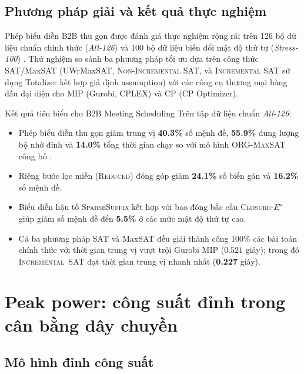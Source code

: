 \subsection{Phương pháp giải và kết quả thực nghiệm}

Phép biểu diễn B2B thu gọn được đánh giá thực nghiệm rộng rãi trên 126 bộ dữ liệu chuẩn chính thức (\emph{All-126}) và 100 bộ dữ liệu biến đổi mật độ thứ tự (\emph{Stress-100}) \parencite{nguyen2026compactsatmaxsatencodings}. Thử nghiệm so sánh ba phương pháp tối ưu dựa trên công thức SAT/MaxSAT (UWrMaxSAT, \textsc{Non-Incremental SAT}, và \textsc{Incremental SAT} sử dụng Totalizer kết hợp giả định assumption) với các công cụ thương mại hàng đầu đại diện cho MIP (Gurobi, CPLEX) và CP (CP Optimizer).

\begin{resultbox}{Kết quả tiêu biểu cho B2B Meeting Scheduling}
Trên tập dữ liệu chuẩn \emph{All-126}:
\begin{itemize}
  \item Phép biểu diễn thu gọn giảm trung vị \textbf{40.3\%} số mệnh đề, \textbf{55.9\%} dung lượng bộ nhớ đỉnh và \textbf{14.0\%} tổng thời gian chạy so với mô hình \mbox{\textsc{ORG-MaxSAT}} công bố \parencite{bofill2022b2b}.
  \item Riêng bước lọc miền (\mbox{\textsc{Reduced}}) đóng góp giảm \textbf{24.1\%} số biến gán và \textbf{16.2\%} số mệnh đề.
  \item Biểu diễn hậu tố \mbox{\textnormal{\textsc{SparseSuffix}}} kết hợp với bao đóng bắc cầu \mbox{\textnormal{\textsc{Closure-}}\ensuremath{E^\star}} giúp giảm số mệnh đề đến \textbf{5.5\%} ở các mức mật độ thứ tự cao.
  \item Cả ba phương pháp SAT và MaxSAT đều giải thành công 100\% các bài toán chính thức với thời gian trung vị vượt trội Gurobi MIP (\(0.521\) giây); trong đó \mbox{\textnormal{\textsc{Incremental SAT}}} đạt thời gian trung vị nhanh nhất (\textbf{0.227} giây).
\end{itemize}
\end{resultbox}

\section{Peak power: công suất đỉnh trong cân bằng dây chuyền}

\subsection{Mô hình đỉnh công suất}

